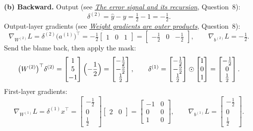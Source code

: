 \documentclass[12pt,a4paper]{article}
\newcommand{\seeconcept}[3]{(see \hyperref[#1]{\textit{#2}}, Question~#3)}
\begin{document}
\textbf{(b) Backward.} Output \seeconcept{c:delta}{The error signal and its recursion}{8}:
\[
\delta^{(2)}=\hat y-y=\tfrac12-1=-\tfrac12 .
\]
Output-layer gradients \seeconcept{c:outer}{Weight gradients are outer products}{8}:
\[
\nabla_{W^{(2)}}L=\delta^{(2)}\bigl(a^{(1)}\bigr)^\top=-\tfrac12\begin{bmatrix}1&0&1\end{bmatrix}=\begin{bmatrix}-\tfrac12&0&-\tfrac12\end{bmatrix},\qquad \nabla_{b^{(2)}}L=-\tfrac12 .
\]
Send the blame back, then apply the mask:
\[
\bigl(W^{(2)}\bigr)^\top\delta^{(2)}=\begin{bmatrix}1\\5\\-1\end{bmatrix}\Bigl(-\frac12\Bigr)=\begin{bmatrix}-\tfrac12\\-\tfrac52\\ \tfrac12\end{bmatrix},\qquad
\delta^{(1)}=\begin{bmatrix}-\tfrac12\\-\tfrac52\\ \tfrac12\end{bmatrix}\odot\begin{bmatrix}1\\0\\1\end{bmatrix}=\begin{bmatrix}-\tfrac12\\0\\ \tfrac12\end{bmatrix}.
\]
First-layer gradients:
\[
\nabla_{W^{(1)}}L=\delta^{(1)}x^\top=\begin{bmatrix}-\tfrac12\\0\\ \tfrac12\end{bmatrix}\begin{bmatrix}2&0\end{bmatrix}=\begin{bmatrix}-1&0\\0&0\\1&0\end{bmatrix},\qquad
\nabla_{b^{(1)}}L=\begin{bmatrix}-\tfrac12\\0\\ \tfrac12\end{bmatrix}.
\]
\end{document}
